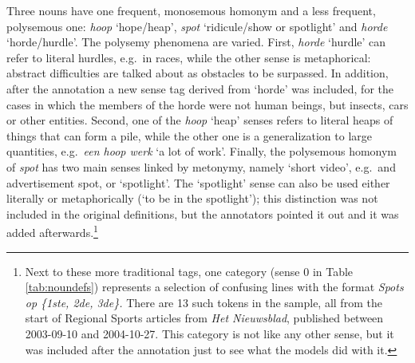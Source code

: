 \documentclass[
]{book}
\begin{document}
Three nouns have one frequent, monosemous homonym and a less frequent, polysemous one: \emph{hoop} `hope/heap', \emph{spot} `ridicule/show or spotlight' and \emph{horde} `horde/hurdle'. The polysemy phenomena are varied. First, \emph{horde} `hurdle' can refer to literal hurdles, e.g.~in races, while the other sense is metaphorical: abstract difficulties are talked about as obstacles to be surpassed. In addition, after the annotation a new sense tag derived from `horde' was included, for the cases in which the members of the horde were not human beings, but insects, cars or other entities.
Second, one of the \emph{hoop} `heap' senses refers to literal heaps of things that can form a pile, while the other one is a generalization to large quantities, e.g.~\emph{een hoop werk} `a lot of work'. Finally, the polysemous homonym of \emph{spot} has two main senses linked by metonymy, namely `short video', e.g.~and advertisement spot, or `spotlight'. The `spotlight' sense can also be used either literally or metaphorically (`to be in the spotlight'); this distinction was not included in the original definitions, but the annotators pointed it out and it was added afterwards.\footnote{Next to these more traditional tags, one category (sense 0 in Table \ref{tab:noundefs}) represents a selection of confusing lines with the format \emph{Spots op \{1ste, 2de, 3de\}.} There are 13 such tokens in the sample, all from the start of Regional Sports articles from \emph{Het Nieuwsblad}, published between 2003-09-10 and 2004-10-27. This category is not like any other sense, but it was included after the annotation just to see what the models did with it.}
\end{document}
